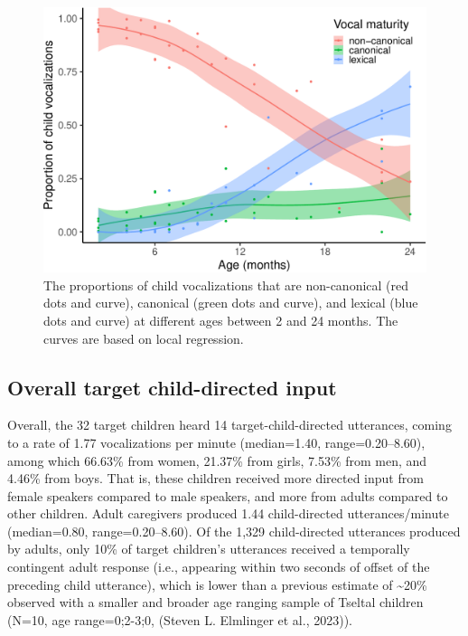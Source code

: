 \documentclass[
  man]{apa6}
\begin{document}
\begin{figure}
\centering
\includegraphics{turntaking_paper_files/figure-latex/vcm-trajectories-plot-1.pdf}
\caption{\label{fig:vcm-trajectories-plot}The proportions of child vocalizations that are non-canonical (red dots and curve), canonical (green dots and curve), and lexical (blue dots and curve) at different ages between 2 and 24 months. The curves are based on local regression.}
\end{figure}

\hypertarget{overall-target-child-directed-input}{%
\subsection{Overall target child-directed input}\label{overall-target-child-directed-input}}

Overall, the 32 target children heard 14 target-child-directed utterances, coming to a rate of 1.77 vocalizations per minute (median=1.40, range=0.20--8.60), among which 66.63\% from women, 21.37\% from girls, 7.53\% from men, and 4.46\% from boys. That is, these children received more directed input from female speakers compared to male speakers, and more from adults compared to other children. Adult caregivers produced 1.44 child-directed utterances/minute (median=0.80, range=0.20--8.60). Of the 1,329 child-directed utterances produced by adults, only 10\% of target children's utterances received a temporally contingent adult response (i.e., appearing within two seconds of offset of the preceding child utterance), which is lower than a previous estimate of \textasciitilde20\% observed with a smaller and broader age ranging sample of Tseltal children (N=10, age range=0;2-3;0, (Steven L. Elmlinger et al., 2023)).
\end{document}
